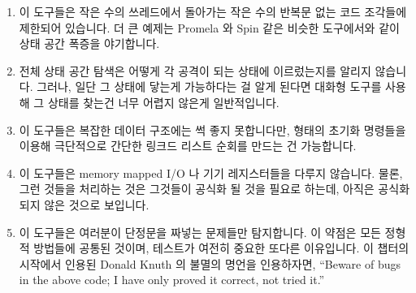 \begin{enumerate}
\fi

\item	이 도구들은 작은 수의 쓰레드에서 돌아가는 작은 수의 반복문 없는 코드
	조각들에 제한되어 있습니다.
	더 큰 예제는 Promela 와 Spin 같은 비슷한 도구에서와 같이 상태 공간
	폭증을 야기합니다.
\item	전체 상태 공간 탐색은 어떻게 각 공격이 되는 상태에 이르렀는지를 알리지
	않습니다.
	그러나, 일단 그 상태에 닿는게 가능하다는 걸 알게 된다면 대화형 도구를
	사용해 그 상태를 찾는건 너무 어렵지 않은게 일반적입니다.
\item	이 도구들은 복잡한 데이터 구조에는 썩 좋지 못합니다만,
	 형태의 초기화 명령들을 이용해 극단적으로 간단한
	링크드 리스트 순회를 만드는 건 가능합니다.
\item	이 도구들은 memory mapped I/O 나 기기 레지스터들을 다루지 않습니다.
	물론, 그런 것들을 처리하는 것은 그것들이 공식화 될 것을 필요로 하는데,
	아직은 공식화 되지 않은 것으로 보입니다.
\item	이 도구들은 여러분이 단정문을 짜넣는 문제들만 탐지합니다.
	이 약점은 모든 정형적 방법들에 공통된 것이며, 테스트가 여전히 중요한
	또다른 이유입니다.
	이 챕터의 시작에서 인용된 Donald Knuth 의 불멸의 명언을 인용하자면,
	``Beware of bugs in the above code; I have only proved it correct, not
	tried it.''

\iffalse

\item	The tools are restricted to small loop-free code fragments
	running on small numbers of threads. Larger examples result
	in state-space explosion, just as with similar tools such as
	Promela and Spin.
\item	The full state-space search does not give any indication of how
	each offending state was reached. That said, once you realize
	that the state is in fact reachable, it is usually not too hard
	to find that state using the interactive tool.
\item	These tools are not much good for complex data structures, although
	it is possible to create and traverse extremely simple linked
	lists using initialization statements of the form
	\qco{x=y; y=z; z=42;}.
\item	These tools do not handle memory mapped I/O or device registers.
	Of course, handling such things would require that they be
	formalized, which does not appear to be in the offing.
\item	The tools will detect only those problems for which you code an
	assertion. This weakness is common to all formal methods, and
	is yet another reason why testing remains important. In the
	immortal words of Donald Knuth quoted at the beginning of this
	chapter, ``Beware of bugs in the above
	code; I have only proved it correct, not tried it.''

\fi

\end{enumerate}

